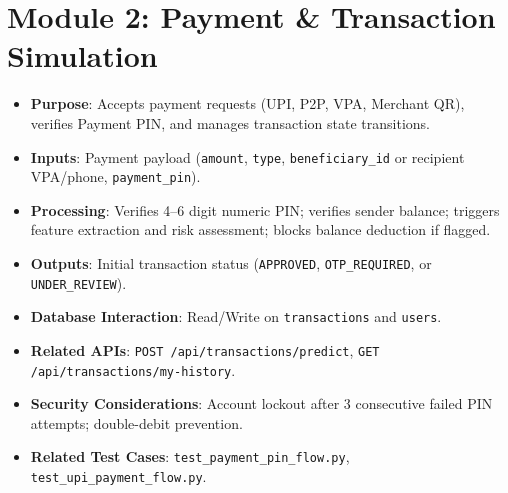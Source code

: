 \section{Module 2: Payment \& Transaction Simulation}
\begin{itemize}
    \item \textbf{Purpose}: Accepts payment requests (UPI, P2P, VPA, Merchant QR), verifies Payment PIN, and manages transaction state transitions.
    \item \textbf{Inputs}: Payment payload (\texttt{amount}, \texttt{type}, \texttt{beneficiary\_id} or recipient VPA/phone, \texttt{payment\_pin}).
    \item \textbf{Processing}: Verifies 4--6 digit numeric PIN; verifies sender balance; triggers feature extraction and risk assessment; blocks balance deduction if flagged.
    \item \textbf{Outputs}: Initial transaction status (\texttt{APPROVED}, \texttt{OTP\_REQUIRED}, or \texttt{UNDER\_REVIEW}).
    \item \textbf{Database Interaction}: Read/Write on \texttt{transactions} and \texttt{users}.
    \item \textbf{Related APIs}: \texttt{POST /api/transactions/predict}, \texttt{GET /api/transactions/my-history}.
    \item \textbf{Security Considerations}: Account lockout after 3 consecutive failed PIN attempts; double-debit prevention.
    \item \textbf{Related Test Cases}: \texttt{test\_payment\_pin\_flow.py}, \texttt{test\_upi\_payment\_flow.py}.
\end{itemize}

